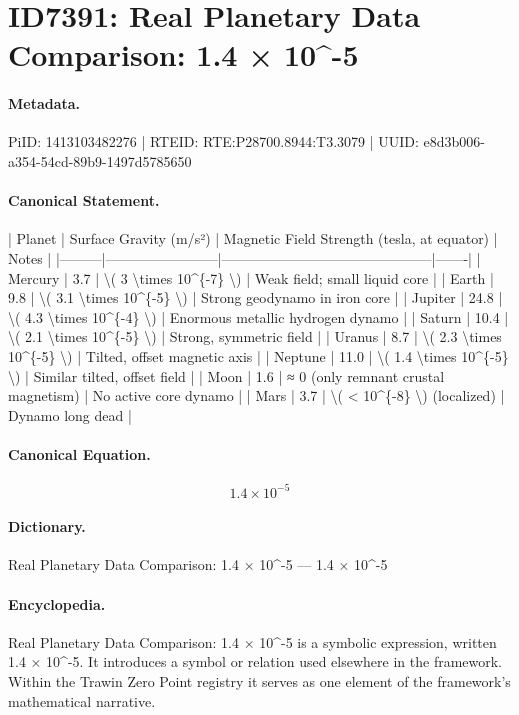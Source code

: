 \section*{ID7391: Real Planetary Data Comparison: 1.4 × 10\textasciicircum{}-5}
\paragraph{Metadata.}
PiID: 1413103482276 | RTEID: RTE:P28700.8944:T3.3079 | UUID: e8d3b006-a354-54cd-89b9-1497d5785650

\paragraph{Canonical Statement.}
| Planet | Surface Gravity (m/s²) | Magnetic Field Strength (tesla, at equator) | Notes | |---------|------------------------|---------------------------------------------|-------| | Mercury | 3.7 | \textbackslash{}( 3 \textbackslash{}times 10\textasciicircum{}\{-7\} \textbackslash{}) | Weak field; small liquid core | | Earth | 9.8 | \textbackslash{}( 3.1 \textbackslash{}times 10\textasciicircum{}\{-5\} \textbackslash{}) | Strong geodynamo in iron core | | Jupiter | 24.8 | \textbackslash{}( 4.3 \textbackslash{}times 10\textasciicircum{}\{-4\} \textbackslash{}) | Enormous metallic hydrogen dynamo | | Saturn | 10.4 | \textbackslash{}( 2.1 \textbackslash{}times 10\textasciicircum{}\{-5\} \textbackslash{}) | Strong, symmetric field | | Uranus | 8.7 | \textbackslash{}( 2.3 \textbackslash{}times 10\textasciicircum{}\{-5\} \textbackslash{}) | Tilted, offset magnetic axis | | Neptune | 11.0 | \textbackslash{}( 1.4 \textbackslash{}times 10\textasciicircum{}\{-5\} \textbackslash{}) | Similar tilted, offset field | | Moon | 1.6 | ≈ 0 (only remnant crustal magnetism) | No active core dynamo | | Mars | 3.7 | \textbackslash{}( < 10\textasciicircum{}\{-8\} \textbackslash{}) (localized) | Dynamo long dead |

\paragraph{Canonical Equation.}
\[
1.4 \times 10^{-5}
\]

\paragraph{Dictionary.}
Real Planetary Data Comparison: 1.4 × 10\textasciicircum{}-5 — 1.4 × 10\textasciicircum{}-5

\paragraph{Encyclopedia.}
Real Planetary Data Comparison: 1.4 × 10\textasciicircum{}-5 is a symbolic expression, written 1.4 × 10\textasciicircum{}-5. It introduces a symbol or relation used elsewhere in the framework. Within the Trawin Zero Point registry it serves as one element of the framework's mathematical narrative.
